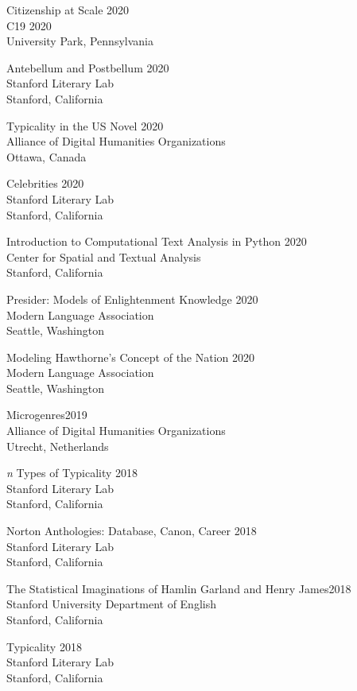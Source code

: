 \documentclass[
  12pt,
  letterpaper,
]{article}
\begin{document}
Citizenship at Scale \hfill 2020\\
C19 2020\\
University Park, Pennsylvania

Antebellum and Postbellum \hfill 2020\\
Stanford Literary Lab\\
Stanford, California

Typicality in the US Novel \hfill 2020\\
Alliance of Digital Humanities Organizations\\
Ottawa, Canada

Celebrities \hfill 2020\\
Stanford Literary Lab\\
Stanford, California

Introduction to Computational Text Analysis in Python \hfill 2020\\
Center for Spatial and Textual Analysis\\
Stanford, California

Presider: Models of Enlightenment Knowledge \hfill 2020\\
Modern Language Association\\
Seattle, Washington

Modeling Hawthorne's Concept of the Nation \hfill 2020\\
Modern Language Association\\
Seattle, Washington

Microgenres\hfill 2019\\
Alliance of Digital Humanities Organizations\\
Utrecht, Netherlands

\emph{n} Types of Typicality \hfill 2018\\
Stanford Literary Lab\\
Stanford, California

Norton Anthologies: Database, Canon, Career \hfill 2018\\
Stanford Literary Lab\\
Stanford, California

The Statistical Imaginations of Hamlin Garland and Henry
James\hfill 2018\\
Stanford University Department of English\\
Stanford, California

Typicality \hfill 2018\\
Stanford Literary Lab\\
Stanford, California
\end{document}
